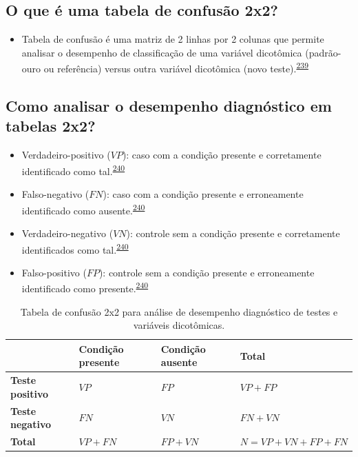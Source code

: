 \documentclass[
  a4paper,
]{book}
\providecommand{\tightlist}{%
  \setlength{\itemsep}{0pt}\setlength{\parskip}{0pt}}
\begin{document}
\hypertarget{o-que-uxe9-uma-tabela-de-confusuxe3o-2x2}{%
\subsection{O que é uma tabela de confusão 2x2?}\label{o-que-uxe9-uma-tabela-de-confusuxe3o-2x2}}

\begin{itemize}
\tightlist
\item
  Tabela de confusão é uma matriz de 2 linhas por 2 colunas que permite analisar o desempenho de classificação de uma variável dicotômica (padrão-ouro ou referência) versus outra variável dicotômica (novo teste).\textsuperscript{\protect\hyperlink{ref-steckelberg2004}{239}}
\end{itemize}

\hypertarget{como-analisar-o-desempenho-diagnuxf3stico-em-tabelas-2x2}{%
\subsection{Como analisar o desempenho diagnóstico em tabelas 2x2?}\label{como-analisar-o-desempenho-diagnuxf3stico-em-tabelas-2x2}}

\begin{itemize}
\item
  Verdadeiro-positivo (\(VP\)): caso com a condição presente e corretamente identificado como tal.\textsuperscript{\protect\hyperlink{ref-greenhalgh1997b}{240}}
\item
  Falso-negativo (\(FN\)): caso com a condição presente e erroneamente identificado como ausente.\textsuperscript{\protect\hyperlink{ref-greenhalgh1997b}{240}}
\item
  Verdadeiro-negativo (\(VN\)): controle sem a condição presente e corretamente identificados como tal.\textsuperscript{\protect\hyperlink{ref-greenhalgh1997b}{240}}
\item
  Falso-positivo (\(FP\)): controle sem a condição presente e erroneamente identificado como presente.\textsuperscript{\protect\hyperlink{ref-greenhalgh1997b}{240}}
\end{itemize}

\begin{table}

\caption{\label{tab:crosstable}Tabela de confusão 2x2 para análise de desempenho diagnóstico de testes e variáveis dicotômicas.}
\centering
\begin{tabu} to 
\toprule
\textbf{ } & \textbf{Condição presente} & \textbf{Condição ausente} & \textbf{Total}\\
\midrule
\textbf{Teste positivo} & $VP$ & $FP$ & $VP+FP$\\
\textbf{Teste negativo} & $FN$ & $VN$ & $FN+VN$\\
\textbf{Total} & $VP+FN$ & $FP+VN$ & $N=VP+VN+FP+FN$\\
\bottomrule
\end{tabu}
\end{table}
\end{document}
